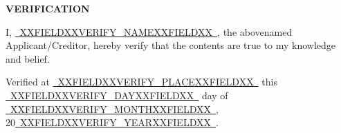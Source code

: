 \documentclass[12pt,a4paper]{article}
\newcommand{\fillline}[1]{\underline{~#1~}}
\begin{document}
\vspace{2em}

\begin{center}
    \large\textbf{VERIFICATION}
\end{center}

\noindent I, \fillline{XXFIELDXXVERIFY_NAMEXXFIELDXX}, the abovenamed Applicant/Creditor, hereby verify
that the contents are true to my knowledge and belief.

\vspace{1em}

\noindent Verified at \fillline{XXFIELDXXVERIFY_PLACEXXFIELDXX} this \fillline{XXFIELDXXVERIFY_DAYXXFIELDXX}
day of \fillline{XXFIELDXXVERIFY_MONTHXXFIELDXX}, 20\fillline{XXFIELDXXVERIFY_YEARXXFIELDXX}.
\end{document}
